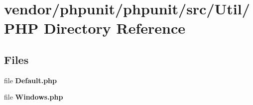 \section{vendor/phpunit/phpunit/src/\+Util/\+P\+H\+P Directory Reference}
\label{dir_417ab675eab1b6587f123a5e27a2e725}
\subsection*{Files}
\begin{DoxyCompactItemize}
\item 
file {\bf Default.\+php}
\item 
file {\bf Windows.\+php}
\end{DoxyCompactItemize}
